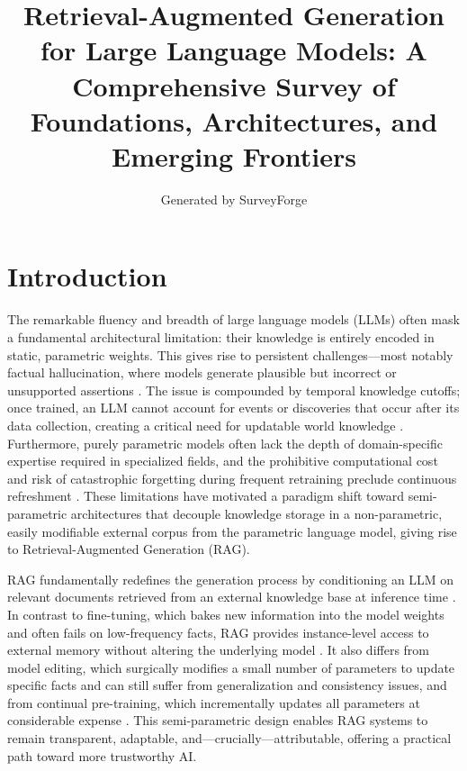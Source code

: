\documentclass[11pt,a4paper]{article}
\title{Retrieval-Augmented Generation for Large Language Models: A Comprehensive Survey of Foundations, Architectures, and Emerging Frontiers}
\author{Generated by SurveyForge}
\date{}
\begin{document}
\maketitle
\tableofcontents
\newpage



\section{Introduction}


The remarkable fluency and breadth of large language models (LLMs) often mask a fundamental architectural limitation: their knowledge is entirely encoded in static, parametric weights. This gives rise to persistent challenges---most notably factual hallucination, where models generate plausible but incorrect or unsupported assertions \cite{arxiv:2005.11401v4,arxiv:2401.01313v3}. The issue is compounded by temporal knowledge cutoffs; once trained, an LLM cannot account for events or discoveries that occur after its data collection, creating a critical need for updatable world knowledge \cite{arxiv:2212.10511v4,arxiv:2310.07521v3}. Furthermore, purely parametric models often lack the depth of domain-specific expertise required in specialized fields, and the prohibitive computational cost and risk of catastrophic forgetting during frequent retraining preclude continuous refreshment \cite{arxiv:2312.05934v3,arxiv:2402.01364v2}. These limitations have motivated a paradigm shift toward semi-parametric architectures that decouple knowledge storage in a non-parametric, easily modifiable external corpus from the parametric language model, giving rise to Retrieval-Augmented Generation (RAG).

RAG fundamentally redefines the generation process by conditioning an LLM on relevant documents retrieved from an external knowledge base at inference time \cite{arxiv:2005.11401v4}. In contrast to fine-tuning, which bakes new information into the model weights and often fails on low-frequency facts, RAG provides instance-level access to external memory without altering the underlying model \cite{arxiv:2402.11457v1}. It also differs from model editing, which surgically modifies a small number of parameters to update specific facts and can still suffer from generalization and consistency issues, and from continual pre-training, which incrementally updates all parameters at considerable expense \cite{arxiv:2402.01364v2,arxiv:2402.04624v1}. This semi-parametric design enables RAG systems to remain transparent, adaptable, and---crucially---attributable, offering a practical path toward more trustworthy AI.
\end{document}
